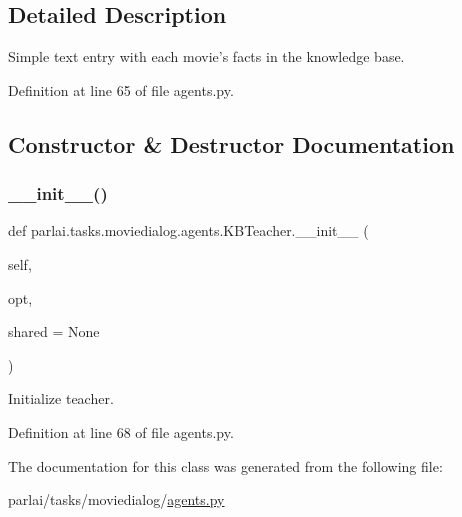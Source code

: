 \subsection{Detailed Description}
\begin{DoxyVerb}Simple text entry with each movie's facts in the knowledge base.\end{DoxyVerb}
 

Definition at line 65 of file agents.\+py.



\subsection{Constructor \& Destructor Documentation}
\mbox{\label{classparlai_1_1tasks_1_1moviedialog_1_1agents_1_1KBTeacher_a3b8e113d7035a814bf991562b2e2b799}} 
\subsubsection{\texorpdfstring{\+\_\+\+\_\+init\+\_\+\+\_\+()}{\_\_init\_\_()}}
{\footnotesize\ttfamily def parlai.\+tasks.\+moviedialog.\+agents.\+K\+B\+Teacher.\+\_\+\+\_\+init\+\_\+\+\_\+ (\begin{DoxyParamCaption}\item[{}]{self,  }\item[{}]{opt,  }\item[{}]{shared = {\ttfamily None} }\end{DoxyParamCaption})}

\begin{DoxyVerb}Initialize teacher.\end{DoxyVerb}
 

Definition at line 68 of file agents.\+py.



The documentation for this class was generated from the following file\+:\begin{DoxyCompactItemize}
\item 
parlai/tasks/moviedialog/\hyperlink{parlai_2tasks_2moviedialog_2agents_8py}{agents.\+py}\end{DoxyCompactItemize}
